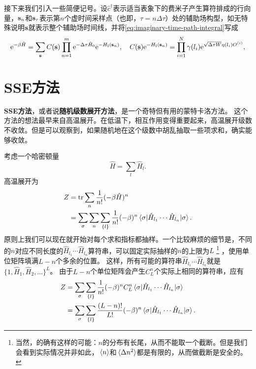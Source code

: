 \documentclass[hyperref, UTF8, a4paper]{ctexart}
\newcommand*{\ee}{\mathrm{e}}
\newcommand*{\concept}[1]{{\textbf{#1}}}
\begin{document}
接下来我们引入一些简便记号。设$\hat{c}^\dagger$表示适当表象下的费米子产生算符排成的行向量，$\vb{s}_n$和$\vb{s}_\tau$表示第$n$个虚时间采样点（也即，$\tau=n\Delta \tau$）处的辅助场构型，如无特殊说明$\vb{s}$就表示整个辅助场时间线，并将\eqref{eq:imaginary-time-path-integral}写成
\begin{equation}
    \ee^{-\beta \hat{H}} = \sum_{\vb{s}} C(\vb{s}) \prod_{n=1}^m \ee^{-\Delta \tau \hat{H}_0} \ee^{-H_\text{I}(\vb{s}_n)}, \quad C(\vb{s}) \ee^{-H_\text{I}(\vb{s}_n)} = \prod_{i=1}^N \gamma(l_i) \ee^{\sqrt{\Delta \tau W} \eta(l_i) O^{(i)}},
    \label{eq:o2-path-integral}
\end{equation}

\section{SSE方法}

\concept{SSE方法}，或者说\concept{随机级数展开方法}，是一个奇特但有用的蒙特卡洛方法。
这个方法的想法最早来自高温展开。在低温下，相互作用变得重要起来，高温展开级数不收敛。但是可以观察到，如果随机地在这个级数中胡乱抽取一些项求和，确实能够收敛。

考虑一个哈密顿量
\begin{equation}
    \hat{H} = \sum_l \hat{H}_l.
\end{equation}
高温展开为
\[
    \begin{aligned}
        Z &= \trace \sum_n \frac{1}{n!} (-\beta \hat{H})^n \\
        &= \sum_\sigma \sum_n \sum_{\{l\}} \frac{1}{n!} (-\beta)^n \mel*{\sigma}{\hat{H}_{l_1} \cdots \hat{H}_{l_n}}{\sigma}.
    \end{aligned}
\]
原则上我们可以现在就开始对每个求和指标都抽样。一个比较麻烦的细节是，不同的$n$对应不同长度的$\hat{H}_{l_1} \cdots \hat{H}_{l_n}$算符串，可以固定实际抽样的$n$的上限为$L$%
\footnote{
    当然，的确有这样的可能：$n$的分布有长尾，从而不能取一个截断。但是我们会看到实际情况并非如此，$\expval*{n}$和$\expval*{\Delta n^2}$都是有限的，从而做截断是安全的。
}%
，使用单位矩阵填满$L-n$个多余的位置。
这样，所有可能的算符串$\hat{H}_{l_1} \cdots \hat{H}_{l_n}$就是$\{1, \hat{H}_1, \hat{H}_2, \ldots\}^L$。
由于$L-n$个单位矩阵会产生$C_L^n$个实际上相同的算符串，应有
\begin{equation}
    \begin{aligned}
        Z &= \sum_\sigma \sum_{\{l\}} \frac{1}{n!} (-\beta)^n C_L^n \mel*{\sigma}{\hat{H}_{l_1} \cdots \hat{H}_{l_n}}{\sigma} \\
        &= \sum_\sigma \sum_{\{l\}} \frac{(L-n)!}{L!} (-\beta)^n \mel*{\sigma}{\hat{H}_{l_1} \cdots \hat{H}_{l_n}}{\sigma}.
    \end{aligned}
\end{equation}
\end{document}
